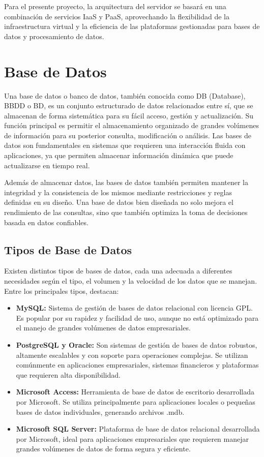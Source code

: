Para el presente proyecto, la arquitectura del servidor se basará en una combinación de servicios IaaS y PaaS, aprovechando la flexibilidad de la infraestructura virtual y la eficiencia de las plataformas gestionadas para bases de datos y procesamiento de datos.


\section{Base de Datos}

Una base de datos o banco de datos, también conocida como DB (Database), BBDD o BD, es un conjunto estructurado de datos relacionados entre sí, que se almacenan de forma sistemática para su fácil acceso, gestión y actualización. Su función principal es permitir el almacenamiento organizado de grandes volúmenes de información para su posterior consulta, modificación o análisis. Las bases de datos son fundamentales en sistemas que requieren una interacción fluida con aplicaciones, ya que permiten almacenar información dinámica que puede actualizarse en tiempo real.

Además de almacenar datos, las bases de datos también permiten mantener la integridad y la consistencia de los mismos mediante restricciones y reglas definidas en su diseño. Una base de datos bien diseñada no solo mejora el rendimiento de las consultas, sino que también optimiza la toma de decisiones basada en datos confiables.

\subsection{Tipos de Base de Datos}

Existen distintos tipos de bases de datos, cada una adecuada a diferentes necesidades según el tipo, el volumen y la velocidad de los datos que se manejan. Entre los principales tipos, destacan:

\begin{itemize}
    \item \textbf{MySQL:} Sistema de gestión de bases de datos relacional con licencia GPL. Es popular por su rapidez y facilidad de uso, aunque no está optimizado para el manejo de grandes volúmenes de datos empresariales.
    
    \item \textbf{PostgreSQL y Oracle:} Son sistemas de gestión de bases de datos robustos, altamente escalables y con soporte para operaciones complejas. Se utilizan comúnmente en aplicaciones empresariales, sistemas financieros y plataformas que requieren alta disponibilidad.
    
    \item \textbf{Microsoft Access:} Herramienta de base de datos de escritorio desarrollada por Microsoft. Se utiliza principalmente para aplicaciones locales o pequeñas bases de datos individuales, generando archivos .mdb.
    
    \item \textbf{Microsoft SQL Server:} Plataforma de base de datos relacional desarrollada por Microsoft, ideal para aplicaciones empresariales que requieren manejar grandes volúmenes de datos de forma segura y eficiente.
\end{itemize}

